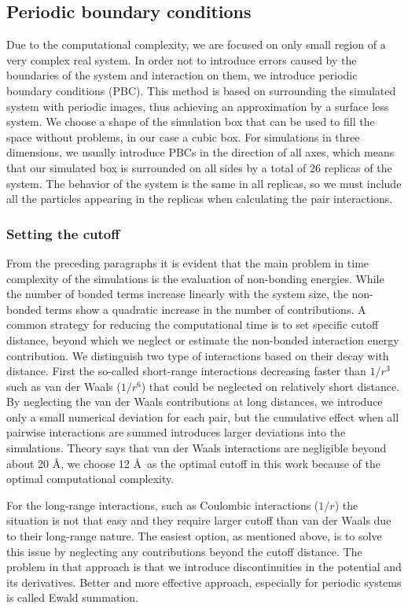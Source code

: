 \subsection{Periodic boundary conditions}
Due to the computational complexity, we are focused on only small region of a very complex real system.  In order not to introduce errors caused by the boundaries of the system and interaction on them, we introduce periodic boundary conditions (PBC). This method is based on surrounding the simulated system with periodic images, thus achieving an approximation by a surface less system. We choose a shape of the simulation box that can be used to fill the space without problems, in our case a cubic box. For simulations in three dimensions, we usually introduce PBCs in the direction of all axes, which means that our simulated box is surrounded on all sides by a total of 26 replicas of the system. The behavior of the system is the same in all replicas, so we must include all the particles appearing in the replicas when calculating the pair interactions. \cite{allen_computer_2017}

\subsubsection{Setting the cutoff}
From the preceding paragraphs it is evident that the main problem in time complexity of the simulations is the evaluation of non-bonding energies. While the number of bonded terms increase linearly with the system size, the non-bonded terms show a quadratic increase in the number of contributions. A common strategy for reducing the computational time is to set specific cutoff distance, beyond which we neglect or estimate the non-bonded interaction energy contribution. We distinguish two type of interactions based on their decay with distance. First the so-called short-range interactions decreasing faster than $1/r^3$ such as van der Waals ($1/r^6$) that could be neglected on relatively short distance. By neglecting the van der Waals contributions at long distances, we introduce only a small numerical deviation for each pair, but the cumulative effect when all pairwise interactions are summed introduces larger deviations into the simulations. Theory says that van der Waals interactions are negligible beyond about 20 \AA, we choose 12 \AA~as the optimal cutoff in this work because of the optimal computational complexity. \cite{mdskripta}

For the long-range interactions, such as Coulombic interactions ($1/r$) the situation is not that easy and they require larger cutoff than van der Waals due to their long-range nature. The easiest option, as mentioned above, is to solve this issue by neglecting any contributions beyond the cutoff distance. The problem in that approach is that we introduce discontinuities in the potential and its derivatives. Better and more effective approach, especially for periodic systems is called Ewald summation.


